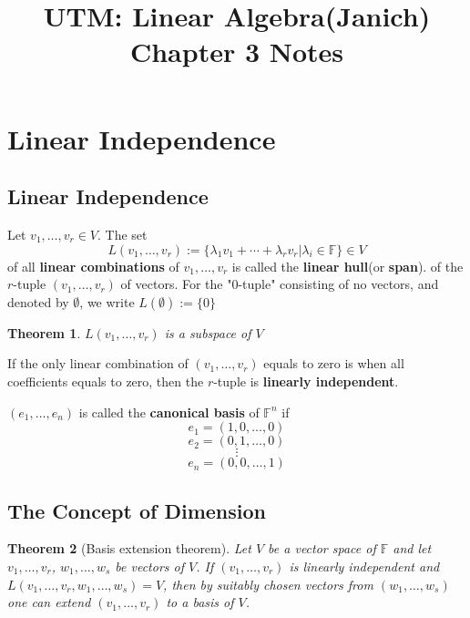 \documentclass[letter]{article}
\title{UTM: Linear Algebra(Janich) Chapter 3 Notes}
\date{}
\newcommand{\F}{\mathbb{F}}
\newtheorem{theorem}{Theorem}[section]
\newenvironment{definition}[1][Definition]{\begin{trivlist}
\item[\hskip \labelsep {\bfseries #1}]}{\end{trivlist}}
\begin{document}
\maketitle
\vspace{-.5in}
\section{Linear Independence}
\subsection{Linear Independence}
\begin{definition}
Let $v_1,\ldots, v_r \in V$. The set
\[
L(v_1,\ldots,v_r) := \{ \lambda_1 v_1 + \cdots + \lambda_r v_r | \lambda_i \in \F\} \in V
\]
of all \textbf{linear combinations} of $v_1,\ldots, v_r$ is called the \textbf{linear hull}(or \textbf{span}). of the $r$-tuple $(v_1,\ldots,v_r)$ of vectors. For the "0-tuple" consisting of no vectors, and denoted by $\emptyset$, we write $L(\emptyset) := \{0\}$
\end{definition}
\begin{theorem}
$L(v_1,\ldots,v_r)$ is a subspace of $V$
\end{theorem}

\begin{definition}
If the only linear combination of $(v_1,\ldots, v_r)$ equals to zero is when all coefficients equals to zero, then the $r$-tuple is \textbf{linearly independent}.
\end{definition}

\begin{definition}
$(e_1,\ldots, e_n)$ is called the \textbf{canonical basis} of $\F^n$ if
\[ e_1 = (1,0,\ldots,0) \]
\[ e_2 = (0,1,\ldots,0) \]
\[\vdots\]
\[ e_n = (0,0,\ldots,1) \]
\end{definition}

\subsection{The Concept of Dimension}
\begin{theorem}[Basis extension theorem]
Let $V$ be a vector space of $\F$ and let $v_1,\ldots,v_r$, $w_1,\ldots,w_s$ be vectors of $V$. If $(v_1,\ldots,v_r)$ is linearly independent and $L(v_1,\ldots,v_r,w_1,\ldots,w_s) = V$, then by suitably chosen vectors from $(w_1,\ldots,w_s)$ one can extend $(v_1, \ldots, v_r)$ to a basis of $V$.
\end{theorem}
\end{document}
